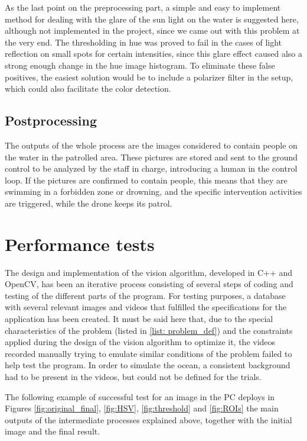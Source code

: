As the last point on the preprocessing part, a simple and easy to implement method for dealing with the glare of the sun light on the water is suggested here, although not implemented in the project, since we came out with this problem at the very end.
The thresholding in hue was proved to fail in the cases of light reflection on small spots for certain intensities, since this glare effect caused also a strong enough change in the hue image histogram. 
To eliminate these false positives, the easiest solution would be to include a polarizer filter in the setup, which could also facilitate the color detection. 

\subsection{Postprocessing}
The outputs of the whole process are the images considered to contain people on the water in the patrolled area. 
These pictures are stored and sent to the ground control to be analyzed by the staff in charge, introducing a human in the control loop.
If the pictures are confirmed to contain people, this means that they are swimming in a forbidden zone or drowning, and the specific intervention activities are triggered, while the drone keeps its patrol. 

\section{Performance tests}
The design and implementation of the vision algorithm, developed in C++ and OpenCV, has been an iterative process consisting of several steps of coding and testing of the different parts of the program. 
For testing purposes, a database with several relevant images and videos that fulfilled the specifications for the application has been created. 
It must be said here that, due to the special characteristics of the problem (listed in \ref{list: problem_def}) and the constraints applied during the design of the vision algorithm to optimize it, the videos recorded manually trying to emulate similar conditions of the problem failed to help test the program. 
In order to simulate the ocean, a consistent background had to be present in the videos, but could not be defined for the trials. 


The following example of successful test for an image in the PC deploys in Figures \ref{fig:original_final}, \ref{fig:HSV}, \ref{fig:threshold} and \ref{fig:ROIs} the main outputs of the intermediate processes explained above, together with the initial image and the final result. 

